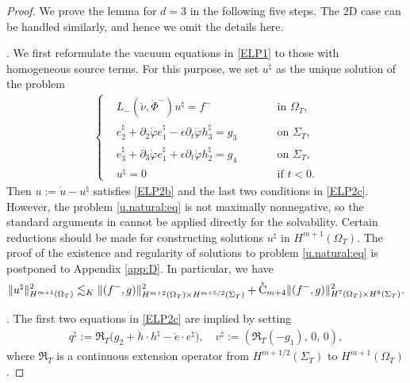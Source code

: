 \documentclass[twoside,11pt]{article}
\numberwithin{equation}{section}
\def\p{\partial}
\begin{document}
	\begin{proof}
We prove the lemma for $d=3$ in the following five steps.		
The 2D case can be handled similarly, and hence we omit the details here. %


		\vspace*{2mm}
		.\quad
		We first reformulate the vacuum equations in \eqref{ELP1} to those with homogeneous source terms.
		For this purpose, we set $u^{\natural}$ as the unique solution of %
		the problem	
		\begin{align}
			\label{u.natural:eq}
			\left\{
			\begin{aligned}
				&L_-(\mathring{\nu},\mathring{\Phi}^-) {u}^{\natural}=f^-
				&\qquad  &\textrm{in } \Omega_T,	\\
				& e_2^{\natural}+\p_2\mathring{\varphi}e_1^{\natural}-\epsilon \p_t\mathring{\varphi} h_3^{\natural}=g_3
				&\quad  &\textrm{on } \Sigma_T,\\[0.3mm]
				& e_3^{\natural}+\p_3\mathring{\varphi}e_1^{\natural}+\epsilon \p_t\mathring{\varphi} h_2^{\natural}=g_4
				&\quad  &\textrm{on } \Sigma_T,\\[0.3mm]		
				&u^{\natural}=0
				&& \textrm{if } t<0.
			\end{aligned}
			\right.
		\end{align}
Then ${u}:=\dot{u}-u^{\natural}$ satisfies \eqref{ELP2b} and the last two conditions in \eqref{ELP2c}.		
However, the problem \eqref{u.natural:eq} is not maximally nonnegative, so the standard arguments in \cite{S95MMASMR1346663,S96aMR1401431,OSY95MR1346224,R85MR0797053} cannot be applied directly for the solvability.
Certain reductions should be made for constructing solutions $u^{\natural}$ in $H^{m+1}(\Omega_{T})$.
The proof of the existence and regularity of solutions to problem \eqref{u.natural:eq} is postponed to Appendix \ref{app:D}.
In particular, we have
\begin{align}   \nonumber
	\| u^{\natural} \|_{H^{m+1}(\Omega_{T})}^2
	\lesssim_K
	\|(f^-, g)\|_{H^{m+2}(\Omega_{T})\times H^{m+{5/2}}(\Sigma_T)}^2
	+ \mathring{\rm C}_{m+4}
	\|(f^-, g)\|_{H^{7}(\Omega_{T})\times H^{8}(\Sigma_T)}^2.
\end{align}

		\vspace*{2mm}
.\quad
The first two equations in \eqref{ELP2c} are implied by
setting
\begin{align} \label{U.sharp:def}
	q^{\natural}:=\mathfrak{R}_{T}\big(g_2+\mathring{h}\cdot h^{\natural}-\mathring{e}\cdot e^{\natural}\big),\quad
	v^{\natural}:=\left(\mathfrak{R}_{T}(-g_1 ),\,  0,\,0\right),
\end{align}
where $\mathfrak{R}_T$ is a continuous extension operator from $H^{m+1/2}(\Sigma_T)$ to $H^{m+1}(\Omega_{T})$.


\end{proof}
\end{document}

